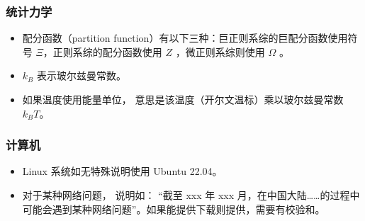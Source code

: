\subsubsection{统计力学}
\begin{itemize}
\item 配分函数（partition function）有以下三种：巨正则系综的巨配分函数使用符号 $\Xi$，正则系综的配分函数使用 $Z$ ，微正则系综则使用 $\Omega$ 。
\item $k_B$ 表示玻尔兹曼常数。
\item 如果温度使用能量单位， 意思是该温度（开尔文温标）乘以玻尔兹曼常数 $k_B T$。
\end{itemize}

\subsubsection{计算机}
\begin{itemize}
\item Linux 系统如无特殊说明使用 Ubuntu 22.04。
\item 对于某种网络问题， 说明如： “截至 xxx 年 xxx 月，在中国大陆……的过程中可能会遇到某种网络问题”。如果能提供下载则提供，需要有校验和。
\end{itemize}
